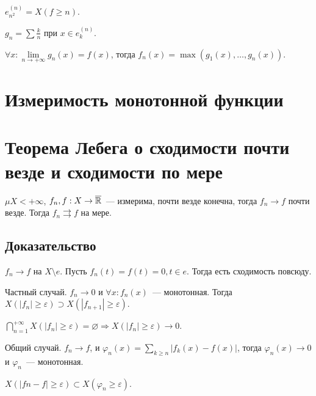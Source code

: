 \documentclass{article}
\begin{document}
            $e^{(n)}_{n^2} = X (f \geqslant n)$.
            
            $g_n = \sum \frac{k}{n}$ при $x \in e^{(n)}_k$.
            
            $\forall x : \lim\limits_{n \rightarrow +\infty} g_n(x) = f(x)$, тогда $f_n(x) = \max (g_1(x), \ldots, g_n(x) )$.
            
    \newpage
    
    \section{Измеримость монотонной функции}
    
    \newpage
    
    \section{Теорема Лебега о сходимости почти везде и сходимости по мере}
    
        $\mu X < +\infty$, $f_n, f : X \rightarrow \overline{\mathbb{R}}$~--- измерима, почти везде конечна, тогда $f_n \rightarrow f$ почти везде. Тогда $f_n \rightrightarrows f$ на мере.
        
        \subsection{Доказательство}
        
            $f_n \rightarrow f$ на $X \setminus e$. Пусть $f_n(t) = f(t) = 0, t \in e$. Тогда есть сходимость повсюду.
            
            Частный случай. $f_n \rightarrow 0$ и $\forall x : f_n(x)$~--- монотонная. Тогда $X \left( | f_n | \geqslant \varepsilon \right) \supset X \left( | f_{n + 1} | \geqslant \varepsilon \right)$.
            
            $\bigcap\limits^{+\infty}_{n = 1} X \left( | f_n | \geqslant \varepsilon \right) = \varnothing \Rightarrow X \left( | f_n | \geqslant \varepsilon \right) \rightarrow 0$.
            
            Общий случай. $f_n \rightarrow f$, и $\varphi_n(x) = \sum\limits_{k \geqslant n} | f_k(x) - f(x) |$, тогда $\varphi_n(x) \rightarrow 0$ и $\varphi_n$~--- монотонная.
            
            $X \left( | fn - f| \geqslant \varepsilon \right) \subset X \left( \varphi_n \geqslant \varepsilon \right)$.
            
    \newpage
    
\end{document}
